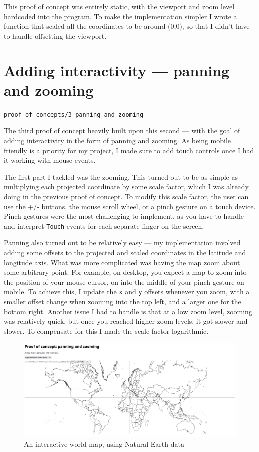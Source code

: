 \documentclass[]{final_report}
\begin{document}
This proof of concept was entirely static, with the viewport and zoom level hardcoded into the program. To make the implementation simpler I wrote a function that scaled all the coordinates to be around (0,0), so that I didn't have to handle offsetting the viewport.

\section{Adding interactivity --- panning and zooming}

\hfill \texttt{proof-of-concepts/3-panning-and-zooming}

The third proof of concept heavily built upon this second --- with the goal of adding interactivity in the form of panning and zooming. As being mobile friendly is a priority for my project, I made sure to add touch controls once I had it working with mouse events.

The first part I tackled was the zooming. This turned out to be as simple as multiplying each projected coordinate by some scale factor, which I was already doing in the previous proof of concept. To modify this scale factor, the user can use the +/- buttons, the mouse scroll wheel, or a pinch gesture on a touch device. Pinch gestures were the most challenging to implement, as you have to handle and interpret \texttt{Touch} events for each separate finger on the screen.

Panning also turned out to be relatively easy --- my implementation involved adding some offsets to the projected and scaled coordinates in the latitude and longitude axis. What was more complicated was having the map zoom about some arbitrary point. For example, on desktop, you expect a map to zoom into the position of your mouse cursor, on into the middle of your pinch gesture on mobile. To achieve this, I update the \texttt{x} and \texttt{y} offsets whenever you zoom, with a smaller offset change when zooming into the top left, and a larger one for the bottom right. Another issue I had to handle is that at a low zoom level, zooming was relatively quick, but once you reached higher zoom levels, it got slower and slower. To compensate for this I made the scale factor logarithmic.

\begin{figure}[ht]
    \centering
    \includegraphics[width=\textwidth]{../proof-of-concepts/3-panning-and-zooming/screenshots/the-world.png}
    \caption{An interactive world map, using Natural Earth data~\cite{natural-earth}}
\end{figure}\label{fig:panning-and-zooming}
\end{document}
